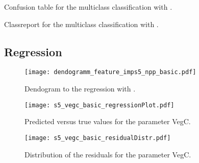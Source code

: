 \begin{table}[h]
  \centering
  
  \caption{Confusion table for the multiclass classification with .}
  \label{tb:s4Basic_with_Biome_Cmax_confTable}
\end{table}
\begin{table}[h]
  \centering
  
  \caption{Classreport for the multiclass classification with .}
  \label{tb:s4Basic_with_Biome_Cmax_classreport}
\end{table}


\clearpage
\subsection{Regression}
\begin{figure}[h]
  \centering
  \texttt{[image: dendogramm\_feature\_imps5\_npp\_basic.pdf]}
  \caption{Dendogram to the regression with .}
  \label{pl:dendogramm_feature_imps5_npp_basic}
\end{figure}

\begin{figure}[h]
  \centering
  \begin{minipage}{0.45\textwidth}
    \centering
    \texttt{[image: s5\_vegc\_basic\_regressionPlot.pdf]}
    \caption{Predicted versus true values for the parameter VegC.}
    \label{pl:s5:vegc:basic:regressionPlot}
  \end{minipage}
  \hfill 
  \begin{minipage}{0.45\textwidth}
    \centering
    \texttt{[image: s5\_vegc\_basic\_residualDistr.pdf]}
    \caption{Distribution of the residuals for the parameter VegC.}
    \label{pl:s5:vegc:basic:residualDistr}
  \end{minipage}
\end{figure}


